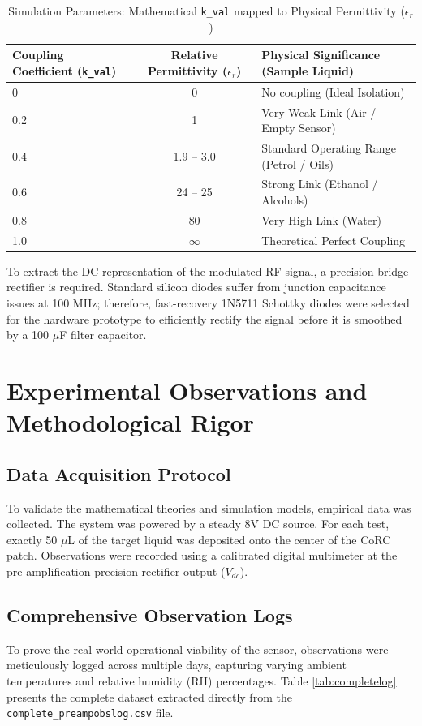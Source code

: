 \documentclass[11pt, a4paper]{article}
\begin{document}
\begin{table}[H]
\centering
\caption{Simulation Parameters: Mathematical \texttt{k\_val} mapped to Physical Permittivity ($\epsilon_r$)}
\label{tab:coupling}
\begin{tabular}{|l|c|l|}
\hline
\textbf{Coupling Coefficient (\texttt{k\_val})} & \textbf{Relative Permittivity ($\epsilon_r$)} & \textbf{Physical Significance (Sample Liquid)} \\ \hline
0 & 0 & No coupling (Ideal Isolation) \\ \hline
0.2 & 1 & Very Weak Link (Air / Empty Sensor) \\ \hline
0.4 & 1.9 -- 3.0 & Standard Operating Range (Petrol / Oils) \\ \hline
0.6 & 24 -- 25 & Strong Link (Ethanol / Alcohols) \\ \hline
0.8 & 80 & Very High Link (Water) \\ \hline
1.0 & $\infty$ & Theoretical Perfect Coupling \\ \hline
\end{tabular}
\end{table}

To extract the DC representation of the modulated RF signal, a precision bridge rectifier is required. Standard silicon diodes suffer from junction capacitance issues at 100 MHz; therefore, fast-recovery 1N5711 Schottky diodes were selected for the hardware prototype to efficiently rectify the signal before it is smoothed by a 100 $\mu$F filter capacitor.

\vspace*{12pt}
\section{Experimental Observations and Methodological Rigor}

\subsection{Data Acquisition Protocol}
To validate the mathematical theories and simulation models, empirical data was collected. The system was powered by a steady 8V DC source. For each test, exactly 50 $\mu$L of the target liquid was deposited onto the center of the CoRC patch. Observations were recorded using a calibrated digital multimeter at the pre-amplification precision rectifier output ($V_{dc}$). 

\subsection{Comprehensive Observation Logs}
To prove the real-world operational viability of the sensor, observations were meticulously logged across multiple days, capturing varying ambient temperatures and relative humidity (RH) percentages. Table \ref{tab:completelog} presents the complete dataset extracted directly from the \texttt{complete\_preampobslog.csv} file.
\end{document}
